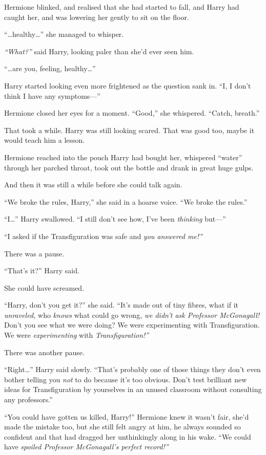 Hermione blinked, and realised that she had started to fall, and Harry
had caught her, and was lowering her gently to sit on the floor.

``\ldots{}healthy\ldots{}'' she managed to whisper.

\emph{``What?''} said Harry, looking paler than she'd ever seen him.

``\ldots{}are you, feeling, healthy\ldots{}''

Harry started looking even more frightened as the question sank in. ``I,
I don't think I have any symptoms---''

Hermione closed her eyes for a moment. ``Good,'' she whispered. ``Catch,
breath.''

That took a while. Harry was still looking scared. That was good too,
maybe it would teach him a lesson.

Hermione reached into the pouch Harry had bought her, whispered
``water'' through her parched throat, took out the bottle and drank in
great huge gulps.

And then it was still a while before she could talk again.

``We broke the rules, Harry,'' she said in a hoarse voice. ``We broke
the rules.''

``I\ldots{}'' Harry swallowed. ``I still don't see how, I've been
\emph{thinking} but---''

``I asked if the Transfiguration was safe and \emph{you answered me!''}

There was a pause.

``That's it?'' Harry said.

She could have screamed.

``Harry, don't you get it?'' she said. ``It's made out of tiny fibres,
what if it \emph{unraveled,} who \emph{knows} what could go wrong,
\emph{we didn't ask Professor McGonagall!} Don't you see what we were
doing? We were experimenting with Transfiguration. We were
\emph{experimenting} with \emph{Transfiguration!''}

There was another pause.

``Right\ldots{}'' Harry said slowly. ``That's probably one of those
things they don't even bother telling you \emph{not} to do because it's
too obvious. Don't test brilliant new ideas for Transfiguration by
yourselves in an unused classroom without consulting any professors.''

``You could have gotten us killed, Harry!'' Hermione knew it wasn't
fair, she'd made the mistake too, but she still felt angry at him, he
always sounded so confident and that had dragged her unthinkingly along
in his wake. ``We could have \emph{spoiled Professor McGonagall's
perfect record!''}

